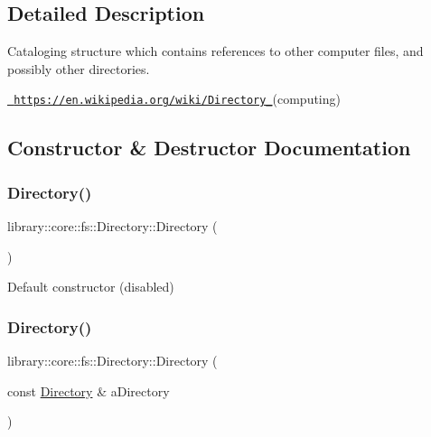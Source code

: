 \subsection{Detailed Description}
Cataloging structure which contains references to other computer files, and possibly other directories. 

\href{https://en.wikipedia.org/wiki/Directory_}{\texttt{ https\+://en.\+wikipedia.\+org/wiki/\+Directory\+\_\+}}(computing) 

\subsection{Constructor \& Destructor Documentation}
\mbox{\label{classlibrary_1_1core_1_1fs_1_1_directory_a3ec39f6cad19a81d520e9a1f2d8bb1f7}} 
\subsubsection{\texorpdfstring{Directory()}{Directory()}\hspace{0.1cm}{\footnotesize\ttfamily [1/2]}}
{\footnotesize\ttfamily library\+::core\+::fs\+::\+Directory\+::\+Directory (\begin{DoxyParamCaption}{ }\end{DoxyParamCaption})\hspace{0.3cm}{\ttfamily [delete]}}



Default constructor (disabled) 

\mbox{\label{classlibrary_1_1core_1_1fs_1_1_directory_ad213042d687444104348dab13a051710}} 
\subsubsection{\texorpdfstring{Directory()}{Directory()}\hspace{0.1cm}{\footnotesize\ttfamily [2/2]}}
{\footnotesize\ttfamily library\+::core\+::fs\+::\+Directory\+::\+Directory (\begin{DoxyParamCaption}\item[{const \mbox{\hyperlink{classlibrary_1_1core_1_1fs_1_1_directory}{Directory}} \&}]{a\+Directory }\end{DoxyParamCaption})\hspace{0.3cm}{\ttfamily [default]}}



